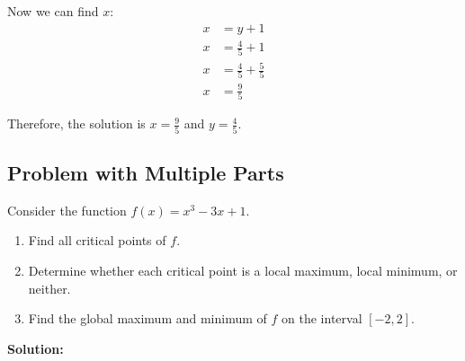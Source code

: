 \documentclass[11pt,a4paper]{article}
\begin{document}
Now we can find $x$:
\begin{align}
    x &= y + 1 \\
    x &= \frac{4}{5} + 1 \\
    x &= \frac{4}{5} + \frac{5}{5} \\
    x &= \frac{9}{5}
\end{align}

Therefore, the solution is $x = \frac{9}{5}$ and $y = \frac{4}{5}$.

\subsection{Problem with Multiple Parts}

\begin{tcolorbox}[title=Problem 3]
    Consider the function $f(x) = x^3 - 3x + 1$.
    \begin{enumerate}[label=(\alph*)]
        \item Find all critical points of $f$.
        \item Determine whether each critical point is a local maximum, local minimum, or neither.
        \item Find the global maximum and minimum of $f$ on the interval $[-2, 2]$.
    \end{enumerate}
\end{tcolorbox}

\textbf{Solution:}
\end{document}
